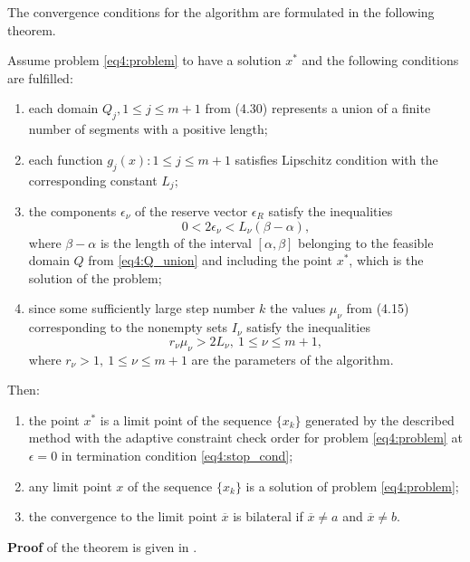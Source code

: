 The convergence conditions for the algorithm are formulated in the following theorem.

\begin{theorem}
Assume problem \eqref{eq4:problem} to have a solution $x^*$ and the following conditions are fulfilled:
\begin{enumerate}
  \item each domain $Q_j ,1\le j\le m+1$ from (4.30) represents a union of a finite number of segments with a positive length;
  \item each function $g_j(x): 1\le j\le m+1$ satisfies Lipschitz condition with the corresponding constant $L_j$;
  \item the components $\epsilon_\nu$ of the reserve vector $\epsilon_R$ satisfy the inequalities
  \begin{equation}
    0<2\epsilon_\nu<L_\nu(\beta-\alpha),
  \end{equation}
  where $\beta-\alpha$ is the length of the interval $[\alpha,\beta]$ belonging to the feasible domain $Q$ from \eqref{eq4:Q_union} and including the point $x^*$, which is the solution of the problem;
  \item since some sufficiently large step number $k$ the values $\mu_\nu$ from (4.15) corresponding to the nonempty sets $I_\nu$ satisfy the inequalities
  \begin{displaymath}
    r_\nu\mu_\nu>2L_\nu,\: 1\le\nu\le m+1,
  \end{displaymath}
  where $r_\nu>1,\: 1\le\nu\le m+1$ are the parameters of the algorithm.
\end{enumerate}

  Then:
  \begin{enumerate}
    \item the point $x^*$ is a limit point of the sequence $\{x_k\}$ generated by the described method with the adaptive constraint check order for problem \eqref{eq4:problem} at $\epsilon=0$ in termination condition \eqref{eq4:stop_cond};
    \item any limit point $x$ of the sequence $\{x_k\}$ is a solution of problem \eqref{eq4:problem};
    \item the convergence to the limit point $\overline x$ is bilateral if $\overline x\not= a$ and $\overline x\not=b$.
  \end{enumerate}
\end{theorem}

\textbf{Proof} of the theorem is given in \cite{SergeyevFamularoPugliese2001}.

